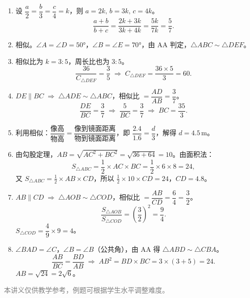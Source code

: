 \documentclass[12pt, a4paper]{ctexart}
\begin{document}
\begin{knowledgebox}[参考答案]
\begin{enumerate}
  \item 设 $\dfrac{a}{2}=\dfrac{b}{3}=\dfrac{c}{4}=k$，则 $a=2k,\,b=3k,\,c=4k$。
  \[
  \frac{a+b}{b+c}=\frac{2k+3k}{3k+4k}=\frac{5k}{7k}=\boxed{\dfrac{5}{7}}.
  \]

  \item 相似。$\angle A=\angle D=50°$，$\angle B=\angle E=70°$，由 AA 判定，$\triangle ABC\sim\triangle DEF$。

  \item 相似比为 $k=3:5$，周长比也为 $3:5$。
  \[
  \frac{36}{C_{\triangle DEF}}=\frac{3}{5}\;\Rightarrow\;C_{\triangle DEF}=\frac{36\times5}{3}=\boxed{60}.
  \]

  \item $DE\parallel BC\;\Rightarrow\;\triangle ADE\sim\triangle ABC$，相似比 $=\dfrac{AD}{AB}=\dfrac{3}{7}$。
  \[
  \frac{DE}{BC}=\frac{3}{7}\;\Rightarrow\;\frac{5}{BC}=\frac{3}{7}\;\Rightarrow\;BC=\boxed{\dfrac{35}{3}}.
  \]

  \item 利用相似：$\dfrac{\text{像高}}{\text{物高}}=\dfrac{\text{像到镜面距离}}{\text{物到镜面距离}}$，即 $\dfrac{2.4}{1.6}=\dfrac{d}{3}$，解得 $d=\boxed{4.5}\,\text{m}$。

  \item 由勾股定理，$AB=\sqrt{AC^2+BC^2}=\sqrt{36+64}=10$。由面积法：
  \[
  S_{\triangle ABC}=\frac{1}{2}\times AC\times BC=\frac{1}{2}\times6\times8=24,
  \]
  又 $S_{\triangle ABC}=\frac{1}{2}\times AB\times CD$，所以 $\frac{1}{2}\times10\times CD=24$，$CD=\boxed{4.8}$。

  \item $AB\parallel CD\;\Rightarrow\;\triangle AOB\sim\triangle COD$，相似比 $=\dfrac{AB}{CD}=\dfrac{6}{4}=\dfrac{3}{2}$。
  \[
  \frac{S_{\triangle AOB}}{S_{\triangle COD}}=\left(\frac{3}{2}\right)^2=\frac{9}{4}.
  \]
  $S_{\triangle COD}=\dfrac{4}{9}\times9=\boxed{4}$。

  \item $\angle BAD=\angle C$，$\angle B=\angle B$（公共角），由 AA 得 $\triangle ABD\sim\triangle CBA$。
  \[
  \frac{AB}{BC}=\frac{BD}{AB}\;\Rightarrow\;AB^2=BD\times BC=3\times(3+5)=24.
  \]
  $AB=\sqrt{24}=\boxed{2\sqrt{6}}$。
\end{enumerate}
\end{knowledgebox}

\vfill
\begin{center}
\small\textcolor{gray}{本讲义仅供教学参考，例题可根据学生水平调整难度。}
\end{center}
\end{document}
